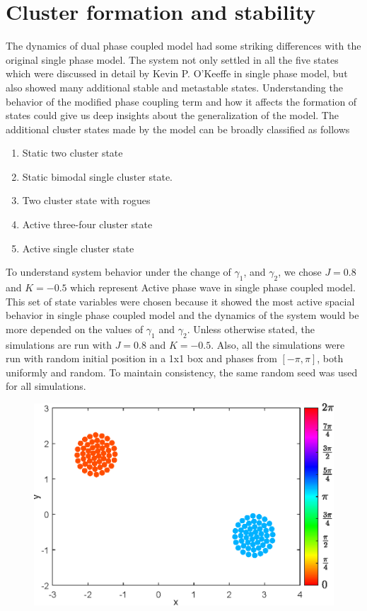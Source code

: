 \documentclass[twocolumn,10pt]{asme2ej}
\begin{document}
\section{Cluster formation and stability}
{
    The dynamics of dual phase coupled model had some striking differences with the original single phase model. The system not only settled in all the five states which were discussed in detail by Kevin P. O'Keeffe in single phase model, but also showed many additional stable and metastable states. Understanding the behavior of the modified phase coupling term and how it affects the formation of states could give us deep insights about the generalization of the model.
    The additional cluster states made by the model can be broadly classified as follows 
    \begin{enumerate}[label = (\alph*)]
        \item Static two cluster state
        \item Static bimodal single cluster state.
        \item Two cluster state with rogues 
        \item Active three-four cluster state
        \item Active single cluster state
    \end{enumerate}
    \noindent
    To understand system behavior under the change of \(\gamma_1\), and \(\gamma_2\), we chose \(J = 0.8\) and \(K = -0.5\) which represent Active phase wave in single phase coupled model. This set of state variables were chosen because it showed the most active spacial behavior in single phase coupled model and the dynamics of the system would be more depended on the values of \(\gamma_1\) and \(\gamma_2\). Unless otherwise stated, the simulations are run with \(J = 0.8\) and \(K = -0.5\). Also, all the simulations were run with random initial position in a 1x1 box and phases from \([-\pi, \pi]\), both uniformly and random. To maintain consistency, the same random seed was used for all simulations.
    \begin{figure}[h!]
        \includegraphics[width = \linewidth]{TwoCluster.eps}

\end{figure}}
\end{document}

